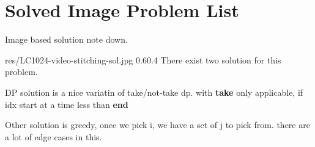 \chapter{Solved Image Problem List}\label{ch:solved-img}

Image based solution note down.

% 

\begin{lfigure}{res/LC1024-video-stitching-sol.jpg}
    {0.6}{0.4} 
    There exist two solution for this problem.

    DP solution is a nice variatin of take/not-take dp. with \textbf{take} only applicable, if idx start at a time less than \textbf{end}

    Other solution is greedy, once we pick i, we have a set of j to pick from.
    there are a lot of edge cases in this.
\end{lfigure}
